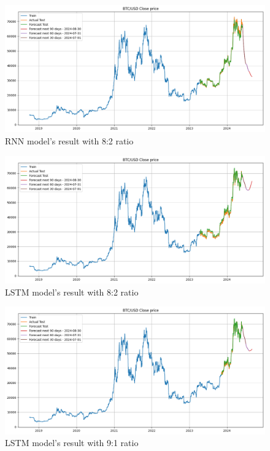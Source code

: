 \documentclass{ieeeojies}
\begin{document}
\begin{figure}[H]
    \centering 
    \includegraphics[width=0.8\linewidth]{./././visualize/RNN/BTC-80-20.png} 
    \caption{RNN model’s result with 8:2 ratio}
    \label{fig:15}
\end{figure}
\begin{figure}[H]
    \centering 
    \includegraphics[width=0.8\linewidth]{./././visualize/LSTM/BTC-80-20.png} 
    \caption{LSTM model’s result with 8:2 ratio}
    \label{fig:16}
\end{figure}
\begin{figure}[H]
    \centering 
    \includegraphics[width=0.8\linewidth]{./././visualize/LSTM/BTC-90-10.png} 
    \caption{LSTM model’s result with 9:1 ratio}
    \label{fig:17}
\end{figure}
\end{document}
